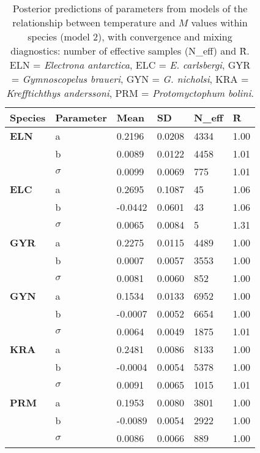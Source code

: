\documentclass[12pt, titlepage]{article}
\begin{document}
\begin{table}[H]
\begin{center}
\caption{Posterior predictions of parameters from models of the relationship between temperature and $M$ values within species (model 2), with convergence and mixing diagnostics: number of effective samples (N\_eff) and \^R. ELN = \textit{Electrona antarctica}, ELC = \textit{E. carlsbergi}, GYR = \textit{Gymnoscopelus braueri}, GYN = \textit{G. nicholsi}, KRA = \textit{Krefftichthys anderssoni}, PRM = \textit{Protomyctophum bolini}.}
\label{tab:SppT}

\def\arraystretch{1.5}
  \begin{tabular}{ | l | l | l | l | l | l |}
    \hline
    \textbf{Species} & \textbf{Parameter} & Mean & SD & N\_eff & \^R \\ \hline
    \textbf{ELN} & a & 0.2196 & 0.0208 & 4334 & 1.00 \\ \hline
     & b & 0.0089 & 0.0122 & 4458 & 1.01 \\ \hline
     & $\sigma$ & 0.0099 & 0.0069 & 775 & 1.01 \\ \hline
     \textbf{ELC} & a & 0.2695 & 0.1087 & 45 & 1.06 \\ \hline
     & b & -0.0442 & 0.0601 & 43 & 1.06 \\ \hline
     & $\sigma$ & 0.0065 & 0.0084 & 5 & 1.31 \\ \hline
     \textbf{GYR} & a & 0.2275 & 0.0115 & 4489 & 1.00 \\ \hline
     & b & 0.0007 & 0.0057 & 3553 & 1.00 \\ \hline
     & $\sigma$ & 0.0081 & 0.0060 & 852 & 1.00 \\ \hline
     \textbf{GYN} & a & 0.1534 & 0.0133 & 6952 & 1.00 \\ \hline
     & b & -0.0007 & 0.0052 & 6654 & 1.00 \\ \hline
     & $\sigma$ & 0.0064 & 0.0049 & 1875 & 1.01 \\ \hline
     \textbf{KRA} & a & 0.2481 & 0.0086 & 8133 & 1.00 \\ \hline
     & b & -0.0004 & 0.0054 & 5378 & 1.00 \\ \hline
     & $\sigma$ & 0.0091 & 0.0065 & 1015 & 1.01 \\ \hline
     \textbf{PRM} & a & 0.1953 & 0.0080 & 3801 & 1.00 \\ \hline
     & b & -0.0089 & 0.0054 & 2922 & 1.00 \\ \hline
     & $\sigma$ & 0.0086 & 0.0066 & 889 & 1.00 \\
    \hline
  \end{tabular}
  \end{center}
\end{table}
\end{document}
